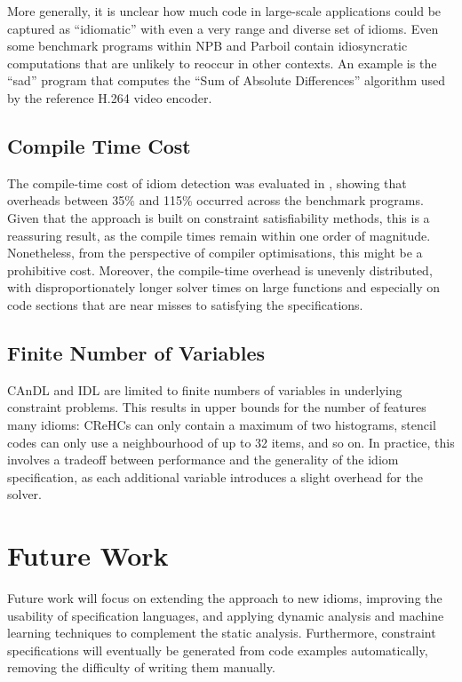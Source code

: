     More generally, it is unclear how much code in large-scale applications
    could be captured as ``idiomatic'' with even a very range and diverse set of
    idioms.
    Even some benchmark programs within NPB and Parboil contain idiosyncratic
    computations that are unlikely to reoccur in other contexts.
    An example is the ``sad'' program that computes the
    ``Sum of Absolute Differences'' algorithm used by the reference H.264 video
    encoder.

\subsection*{Compile Time Cost}

    The compile-time cost of idiom detection was evaluated in
    , showing that overheads between 35$\%$ and 115$\%$
    occurred across the benchmark programs.
    Given that the approach is built on constraint satisfiability methods, this
    is a reassuring result, as the compile times remain within one order of
    magnitude.
    Nonetheless, from the perspective of compiler optimisations, this might be
    a prohibitive cost.
    Moreover, the compile-time overhead is unevenly distributed, with
    disproportionately longer solver times on large functions and especially on
    code sections that are near misses to satisfying the specifications.

\subsection*{Finite Number of Variables}

    CAnDL and IDL are limited to finite numbers of variables in underlying
    constraint problems.
    This results in upper bounds for the number of features many idioms:
    CReHCs can only contain a maximum of two histograms, stencil codes can only
    use a neighbourhood of up to 32 items, and so on.
    In practice, this involves a tradeoff between performance and the generality
    of the idiom specification, as each additional variable introduces a slight
    overhead for the solver.

\section{Future Work}

    Future work will focus on extending the approach to new idioms,
    improving the usability of specification languages, and
    applying dynamic analysis and machine learning techniques to complement the
    static analysis.
    Furthermore, constraint specifications will eventually be generated from
    code examples automatically, removing the difficulty of writing them
    manually.

